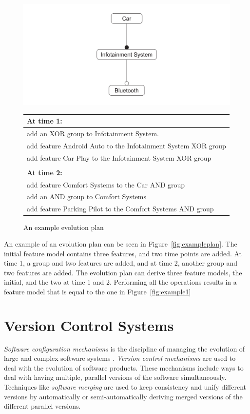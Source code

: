 \documentclass[a4paper,english]{ifimaster}
\begin{document}
\begin{figure}[htpb]
	\centering
	\includegraphics[width=0.8\linewidth]{illustrations/initial.pdf}
	\begin{tabular}{l}
		\textbf{At time 1:}                                           \\ \hline
		add an XOR group to Infotainment System.                      \\
		add feature Android Auto to the Infotainment System XOR group \\
		add feature Car Play to the Infotainment System XOR group     \\
		\\
		\textbf{At time 2:}                                           \\ \hline
		add feature Comfort Systems to the Car AND group              \\
		add an AND group to Comfort Systems                           \\
		add feature Parking Pilot to the Comfort Systems AND group
	\end{tabular}
	\caption{An example evolution plan}%
	\label{fig:exampleplan}
\end{figure}

An example of an evolution plan can be seen in Figure~\vref{fig:exampleplan}. The initial feature model contains three features, and two time points are added. At time 1, a group and two features are added, and at time 2, another group and two features are added. The evolution plan can derive three feature models, the initial, and the two at time 1 and 2. Performing all the operations results in a feature model that is equal to the one in Figure~\vref{fig:example1}

\section{Version Control Systems}%
\label{sec:version_control_systems}

\textit{Software configuration mechanisms} is the discipline of managing the evolution of large and complex software systems \cite{cite:software_configuration_management}. \textit{Version control mechanisms} are used to deal with the evolution of software products. These mechanisms include ways to deal with having multiple, parallel versions of the software simultaneously. Techniques like \textit{software merging} are used to keep consistency and unify different versions by automatically or semi-automatically deriving merged versions of the different parallel versions.
\end{document}
